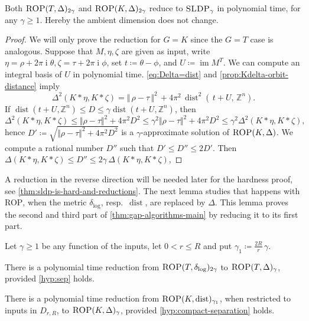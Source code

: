 \documentclass[a4paper,USenglish,cleveref,numberwithinsect]{lipics-v2021}
\DeclareMathOperator{\ii}{i}
\DeclareMathOperator{\dist}{dist}
\newcommand{\distLD}{\delta_{\log}}
\DeclareMathOperator{\ran}{im}
\newcommand{\ZZ}{\mathbb{Z}}
\numberwithin{equation}{section}
\begin{document}
\begin{lemma}\label{le:ROP-SLP}
Both $\textsc{ROP}(T,\Delta)_{2\gamma}$ and
$\textsc{ROP}(K,\Delta)_{2\gamma}$
reduce to $\textsc{SLDP}_{\gamma}$ in polynomial time,
for any $\gamma \ge 1$.
Hereby the ambient dimension does not change.
\end{lemma}

\begin{proof}
We will only prove the reduction for $G=K$ since the $G=T$ case is analogous.
Suppose that $M,\eta,\zeta$ are given as input, write
$\eta=\rho+2\pi\ii\theta, \zeta=\tau+2\pi\ii\phi$,
set $t\coloneqq \theta-\phi$, and
$U\coloneqq \ran M^T$.
We can compute an integral basis of $U$ in polynomial time.
 \cref{eq:Delta=dist} and \cref{prop:Kdelta-orbit-distance} imply
\[
\Delta^2(K\ast \eta,K\ast\zeta)
   = \Vert\, \rho-\tau\,\Vert^2 \, + 4\pi^2 \, \dist^2(\,t + U, \, \ZZ^n) .
\]
If $\dist(t+U,\ZZ^n)\leq D\leq \gamma \dist(t+U,\ZZ^n)$, then
\[
 \Delta^2(K\ast\eta,K\ast\zeta)\leq \Vert \rho-\tau\Vert^2 + 4\pi^2 D^2
   \leq \gamma^2 \Vert\rho-\tau\Vert^2 + 4\pi^2 D^2 \leq \gamma^2 \Delta^2(K\ast\eta,K\ast\zeta),
\]
hence $D'\coloneqq \sqrt{\Vert \rho-\tau\Vert^2 + 4\pi^2 D^2}$ is a $\gamma$-approximate solution of
$\textsc{ROP}(K,\Delta)$.
We compute a rational number $D''$ such that $D'\leq D''\leq 2 D'$. Then
$\Delta(K\ast\eta,K\ast\zeta) \leq D''\leq 2 \gamma \, \Delta(K\ast\eta,K\ast\zeta)$,
\end{proof}

A reduction in the reverse direction will be needed later for the hardness proof,
see \cref{thm:sldp-is-hard-and-reductions}.
The next lemma studies that happens with \textsc{ROP}, when the
metric $\distLD$, resp.~$\dist$, are replaced by $\Delta$.
This lemma proves the second and third part of \cref{thm:gap-algorithms-main}
by reducing it to its first part.

\begin{lemma}
\label{prop:delta-to-Delta-reduction}
Let $\gamma \ge 1$ be any function of the inputs, let $0 <r \le R$
and put $\gamma_1\coloneqq \frac{2R}{r}\,\gamma$.
\begin{alphaenumerate}
\item\label{it:dD 1}
There is a polynomial time reduction from
$\textsc{ROP}(T,\distLD)_{2\gamma}$ to $\textsc{ROP}(T,\Delta)_{\gamma}$,
provided  \cref{hyp:sep} holds.

\item\label{it:dD 2}
There is a polynomial time reduction from
$\textsc{ROP}(K,\dist)_{\gamma_1}$, when restricted to inputs in $D_{r,R}$,
to $\textsc{ROP}(K,\Delta)_{\gamma}$,
provided \cref{hyp:compact-separation} holds.
\end{alphaenumerate}
\end{lemma}
\end{document}
